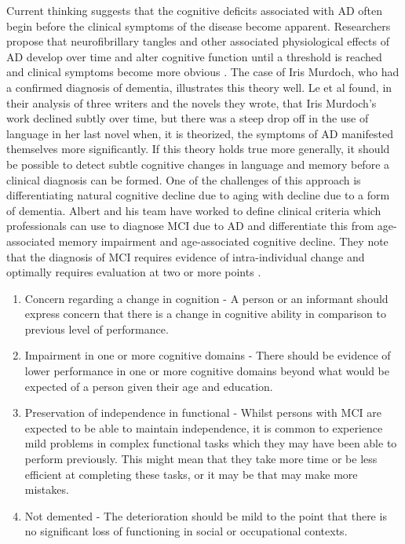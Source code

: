 \documentclass[10pt, letterpaper, twoside, openany]{book}
\begin{document}
\par
Current thinking suggests that the cognitive deficits associated with AD often begin before the clinical symptoms of the disease become apparent. Researchers propose that neurofibrillary tangles and other associated physiological effects of AD develop over time and alter cognitive function until a threshold is reached and clinical symptoms become more obvious \cite{Nestor2006}. The case of Iris Murdoch, who had a confirmed diagnosis of dementia, illustrates this theory well. Le et al \cite{Le2011} found, in their analysis of three writers and the novels they wrote, that Iris Murdoch's work declined subtly over time, but there was a steep drop off in the use of language in her last novel when, it is theorized, the symptoms of AD manifested themselves more significantly. If this theory holds true more generally, it should be possible to detect subtle cognitive changes in language and memory before a clinical diagnosis can be formed. One of the challenges of this approach is differentiating natural cognitive decline due to aging with decline due to a form of dementia. Albert and his team have worked to define clinical criteria which professionals can use to diagnose MCI due to AD and differentiate this from age-associated memory impairment and age-associated cognitive decline. They note that the diagnosis of MCI requires evidence of intra-individual change and optimally requires evaluation at two or more points \cite{Albert2011}.
\begin{enumerate}
	\item Concern regarding a change in cognition - A person or an informant should express concern that there is a change in cognitive ability in comparison to previous level of performance.
	\item Impairment in one or more cognitive domains - There should be evidence of lower performance in one or more cognitive domains beyond what would be expected of a person given their age and education. 
	\item Preservation of independence in functional - Whilst persons with MCI are expected to be able to maintain independence, it is common to experience mild problems in complex functional tasks which they may have been able to perform previously. This might mean that they take more time or be less efficient at completing these tasks, or it may be that may make more mistakes.
	\item Not demented - The deterioration should be mild to the point that there is no significant loss of functioning in social or occupational contexts.
\end{enumerate}
\end{document}
